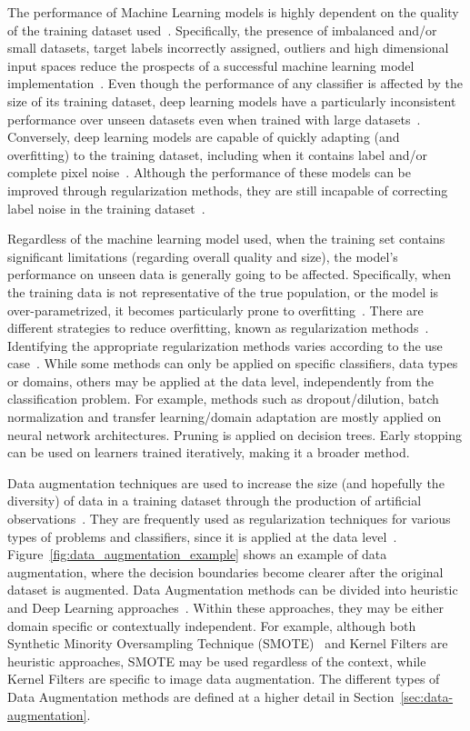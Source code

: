 \documentclass[pdflatex,sn-mathphys]{sn-jnl}%
\theoremstyle{thmstyleone}
\theoremstyle{thmstyletwo}
\theoremstyle{thmstylethree}
\begin{document}
The performance of Machine Learning models is highly dependent on the quality
of the training dataset used~\cite{Fenza2021, Halevy2009}. Specifically, the
presence of imbalanced and/or small datasets, target labels incorrectly
assigned, outliers and high dimensional input spaces reduce the prospects of a
successful machine learning model implementation~\cite{Halevy2009,
Domingos2012, Salman2019}.  Even though the performance of any classifier is
affected by the size of its training dataset, deep learning models have a
particularly inconsistent performance over unseen datasets even when trained
with large datasets~\cite{Hu2020, Xie2021}.  Conversely, deep learning models
are capable of quickly adapting (and overfitting) to the training dataset,
including when it contains label and/or complete pixel noise~\cite{Xie2021,
Zhang2021}.  Although the performance of these models can be improved through
regularization methods, they are still incapable of correcting label noise in
the training dataset~\cite{Zhang2021}.

Regardless of the machine learning model used, when the training set contains
significant limitations (regarding overall quality and size), the model's
performance on unseen data is generally going to be affected. Specifically,
when the training data is not representative of the true population, or the
model is over-parametrized, it becomes particularly prone to
overfitting~\cite{Bartlett2021}. There are different strategies to reduce
overfitting, known as regularization methods~\cite{Shorten2019}. Identifying
the appropriate regularization methods varies according to the use
case~\cite{Chun2020}. While some methods can only be applied on specific
classifiers, data types or domains, others may be applied at the data level,
independently from the classification problem. For example, methods such as
dropout/dilution, batch normalization and transfer learning/domain adaptation
are mostly applied on neural network architectures.  Pruning is applied on
decision trees. Early stopping can be used on learners trained iteratively,
making it a broader method. 

Data augmentation techniques are used to increase the size (and hopefully the
diversity) of data in a training dataset through the production of artificial
observations~\cite{Van2001, Wong2016}. They are frequently used as
regularization techniques for various types of problems and classifiers, since
it is applied at the data level~\cite{Behpour2019}.
Figure~\ref{fig:data_augmentation_example} shows an example of data
augmentation, where the decision boundaries become clearer after the original
dataset is augmented. Data Augmentation methods can be divided into heuristic
and Deep Learning approaches~\cite{Shorten2019, Ratner2017}. Within these
approaches, they may be either domain specific or contextually independent.
For example, although both Synthetic Minority Oversampling Technique
(SMOTE)~\cite{Chawla2002} and Kernel Filters are heuristic approaches, SMOTE
may be used regardless of the context, while Kernel Filters are specific to
image data augmentation. The different types of Data Augmentation methods are
defined at a higher detail in Section~\ref{sec:data-augmentation}.
\end{document}
